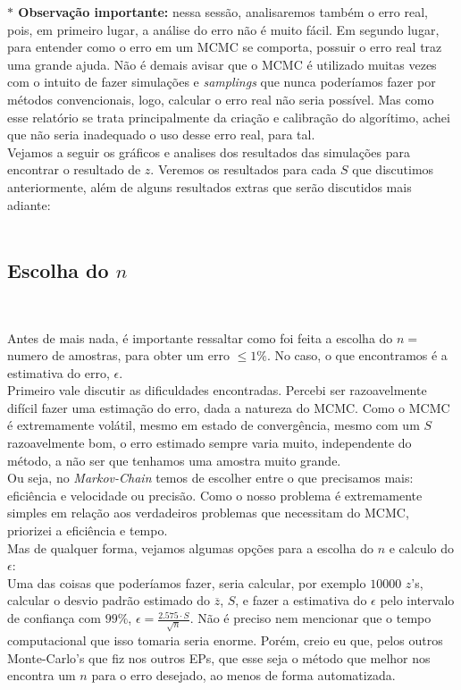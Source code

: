 \documentclass[pt12]{article}
\begin{document}
\textbf{$\ast$ Observação importante:} nessa sessão, analisaremos também o erro real, pois, em primeiro lugar, a análise do erro não é muito fácil. Em segundo lugar, para entender como o erro em um MCMC se comporta, possuir o erro real traz uma grande ajuda. Não é demais avisar que o MCMC é utilizado muitas vezes com o intuito de fazer simulações e \textit{samplings} que nunca poderíamos fazer por métodos convencionais, logo, calcular o erro real não seria possível. Mas como esse relatório se trata principalmente da criação e calibração do algorítimo, achei que não seria inadequado o uso desse erro real, para tal.\\

Vejamos a seguir os gráficos e analises dos resultados das simulações para encontrar o resultado de $z$. Veremos os resultados para cada $S$ que discutimos anteriormente, além de alguns resultados extras que serão discutidos mais adiante:\\
\ 

\subsection{Escolha do $n$}
\ 

Antes de mais nada, é importante ressaltar como foi feita a escolha do $n =$ numero de amostras, para obter um erro $\leq 1\%$. No caso, o que encontramos é a estimativa do erro, $\epsilon$.\\

Primeiro vale discutir as dificuldades encontradas. Percebi ser razoavelmente difícil fazer uma estimação do erro, dada a natureza do MCMC. Como o MCMC é extremamente volátil, mesmo em estado de convergência, mesmo com um $S$ razoavelmente bom, o erro estimado sempre varia muito, independente do método, a não ser que tenhamos uma amostra muito grande.\\

Ou seja, no \textit{Markov-Chain} temos de escolher entre o que precisamos mais: eficiência e velocidade ou precisão. Como o nosso problema é extremamente simples em relação aos verdadeiros problemas que necessitam do MCMC, priorizei a eficiência e tempo.\\

Mas de qualquer forma, vejamos algumas opções para a escolha do $n$ e calculo do $\epsilon$:\\

\indent Uma das coisas que poderíamos fazer, seria calcular, por exemplo $10000$ $z$'s, calcular o desvio padrão estimado do $\overline{z}$, $S$, e fazer a estimativa do $\epsilon$ pelo intervalo de confiança com $99\%$, $\displaystyle{\epsilon =  \frac{2.575\cdot S}{\sqrt{n}}}$. Não é preciso nem mencionar que o tempo computacional que isso tomaria seria enorme. Porém, creio eu que, pelos outros Monte-Carlo's que fiz nos outros EPs, que esse seja o método que melhor nos encontra um $n$ para o erro desejado, ao menos de forma automatizada.\\
\end{document}
